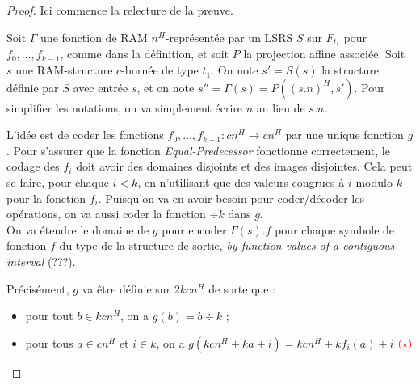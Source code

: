 \documentclass{article}
\begin{document}
		\begin{proof}
			Ici commence la relecture de la preuve.
			
			Soit $\Gamma$ une fonction de RAM $n^H$-représentée par un LSRS $S$ sur $F_{t_1}$ pour $f_0, \dots, f_{k-1}$, comme dans la définition, et soit $P$ la projection affine associée. Soit $s$ une RAM-structure $c$-bornée de type $t_1$. On note $s' = S(s)$ la structure définie par $S$ avec entrée $s$, et on note $s'' = \Gamma(s) = P\left( (s.n)^H, s'\right)$. Pour simplifier les notations, on va simplement écrire $n$ au lieu de $s.n$.
			
			L'idée est de coder les fonctions $f_0, \dots, f_{k-1} : cn^H \to cn^H$ par une unique fonction $g$. Pour s'assurer que la fonction \emph{Equal-Predecessor} fonctionne correctement, le codage des $f_i$ doit avoir des domaines disjoints et des images disjointes. Cela peut se faire, pour chaque $i<k$, en n'utilisant que des valeurs congrues à $i$ modulo $k$ pour la fonction $f_i$. Puisqu'on va en avoir besoin pour coder/décoder les opérations, on va aussi coder la fonction $\div k$ dans $g$.\\
			
			On va étendre le domaine de $g$ pour encoder $\Gamma(s).f$ pour chaque symbole de fonction $f$ du type de la structure de sortie, \emph{by function values of a contiguous interval} (???).
			
			Précisément, $g$ va être définie sur $2kcn^H$ de sorte que :
			
			\begin{itemize}[itemsep=-1mm]
				\item	pour tout $b \in kcn^H$, on a $g(b) = b \div k$ ;
				\item 	pour tous $a \in cn^H$ et $i \in k$, on a $g\left( kcn^H + ka + i \right) = kcn^H + k f_i(a) + i$ $\textcolor{red}{(\star)}$
			\end{itemize}
			
			\espace
			
\end{proof}
\end{document}
